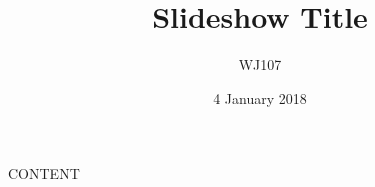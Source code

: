 \documentclass[12pt]{beamer}
\begin{document}
\title{Slideshow Title}
\author{WJ107}
\date{4 January 2018}
\maketitle

CONTENT
\end{document}
